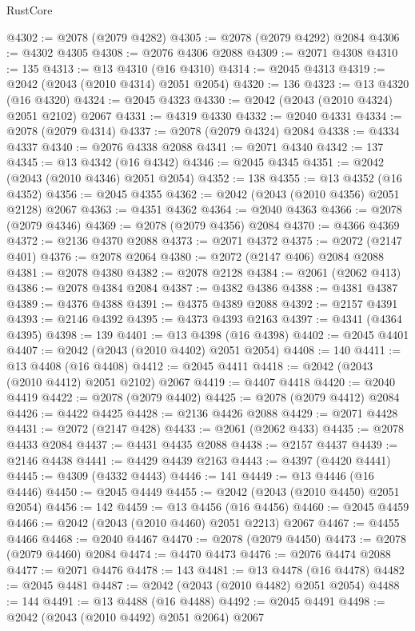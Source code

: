 \begin{lexlean}{RustCore}
\begin{coremodule}
@4302 := @2078 (@2079 @4282)
@4305 := @2078 (@2079 @4292) @2084
@4306 := @4302 @4305
@4308 := @2076 @4306 @2088
@4309 := @2071 @4308
@4310 := 135
@4313 := @13 @4310 (@16 @4310)
@4314 := @2045 @4313
@4319 := @2042 (@2043 (@2010 @4314) @2051 @2054)
@4320 := 136
@4323 := @13 @4320 (@16 @4320)
@4324 := @2045 @4323
@4330 := @2042 (@2043 (@2010 @4324) @2051 @2102) @2067
@4331 := @4319 @4330
@4332 := @2040 @4331
@4334 := @2078 (@2079 @4314)
@4337 := @2078 (@2079 @4324) @2084
@4338 := @4334 @4337
@4340 := @2076 @4338 @2088
@4341 := @2071 @4340
@4342 := 137
@4345 := @13 @4342 (@16 @4342)
@4346 := @2045 @4345
@4351 := @2042 (@2043 (@2010 @4346) @2051 @2054)
@4352 := 138
@4355 := @13 @4352 (@16 @4352)
@4356 := @2045 @4355
@4362 := @2042 (@2043 (@2010 @4356) @2051 @2128) @2067
@4363 := @4351 @4362
@4364 := @2040 @4363
@4366 := @2078 (@2079 @4346)
@4369 := @2078 (@2079 @4356) @2084
@4370 := @4366 @4369
@4372 := @2136 @4370 @2088
@4373 := @2071 @4372
@4375 := @2072 (@2147 @401)
@4376 := @2078 @2064
@4380 := @2072 (@2147 @406) @2084 @2088
@4381 := @2078 @4380
@4382 := @2078 @2128
@4384 := @2061 (@2062 @413)
@4386 := @2078 @4384 @2084
@4387 := @4382 @4386
@4388 := @4381 @4387
@4389 := @4376 @4388
@4391 := @4375 @4389 @2088
@4392 := @2157 @4391
@4393 := @2146 @4392
@4395 := @4373 @4393 @2163
@4397 := @4341 (@4364 @4395)
@4398 := 139
@4401 := @13 @4398 (@16 @4398)
@4402 := @2045 @4401
@4407 := @2042 (@2043 (@2010 @4402) @2051 @2054)
@4408 := 140
@4411 := @13 @4408 (@16 @4408)
@4412 := @2045 @4411
@4418 := @2042 (@2043 (@2010 @4412) @2051 @2102) @2067
@4419 := @4407 @4418
@4420 := @2040 @4419
@4422 := @2078 (@2079 @4402)
@4425 := @2078 (@2079 @4412) @2084
@4426 := @4422 @4425
@4428 := @2136 @4426 @2088
@4429 := @2071 @4428
@4431 := @2072 (@2147 @428)
@4433 := @2061 (@2062 @433)
@4435 := @2078 @4433 @2084
@4437 := @4431 @4435 @2088
@4438 := @2157 @4437
@4439 := @2146 @4438
@4441 := @4429 @4439 @2163
@4443 := @4397 (@4420 @4441)
@4445 := @4309 (@4332 @4443)
@4446 := 141
@4449 := @13 @4446 (@16 @4446)
@4450 := @2045 @4449
@4455 := @2042 (@2043 (@2010 @4450) @2051 @2054)
@4456 := 142
@4459 := @13 @4456 (@16 @4456)
@4460 := @2045 @4459
@4466 := @2042 (@2043 (@2010 @4460) @2051 @2213) @2067
@4467 := @4455 @4466
@4468 := @2040 @4467
@4470 := @2078 (@2079 @4450)
@4473 := @2078 (@2079 @4460) @2084
@4474 := @4470 @4473
@4476 := @2076 @4474 @2088
@4477 := @2071 @4476
@4478 := 143
@4481 := @13 @4478 (@16 @4478)
@4482 := @2045 @4481
@4487 := @2042 (@2043 (@2010 @4482) @2051 @2054)
@4488 := 144
@4491 := @13 @4488 (@16 @4488)
@4492 := @2045 @4491
@4498 := @2042 (@2043 (@2010 @4492) @2051 @2064) @2067

\end{coremodule}
\end{lexlean}
